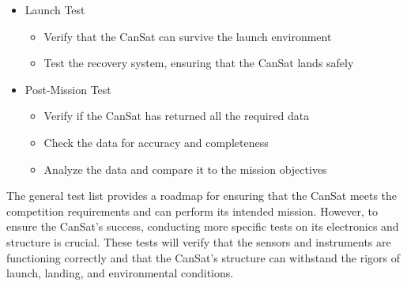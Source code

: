 \documentclass[11pt]{article}
\begin{document}
\begin{itemize}[leftmargin=1cm, itemindent=0.25cm, noitemsep, topsep=0pt, label=]
\item Launch Test
\begin{itemize}[label=, noitemsep, topsep=2pt]
\item Verify that the CanSat can survive the launch environment
\item Test the recovery system, ensuring that the CanSat lands safely
\end{itemize}

\item Post-Mission Test
\begin{itemize}[label=, noitemsep, topsep=2pt]
\item Verify if the CanSat has returned all the required data
\item Check the data for accuracy and completeness
\item Analyze the data and compare it to the mission objectives
\end{itemize}

\end{itemize}

The general test list provides a roadmap for ensuring that the CanSat meets the competition requirements and can perform its intended mission. However, to ensure the CanSat's success, conducting more specific tests on its electronics and structure is crucial. These tests will verify that the sensors and instruments are functioning correctly and that the CanSat's structure can withstand the rigors of launch, landing, and environmental conditions. 
\end{document}
